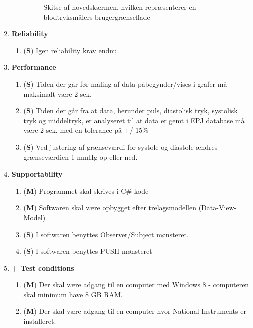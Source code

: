 \begin{enumerate}
\begin{enumerate}
\begin{figure}[h!]
\caption{Skitse af hovedskærmen, hvilken repræsenterer en blodtryksmålers brugergrænseflade}
\end{figure}
\end{enumerate}
\item \textbf{Reliability}
\begin{enumerate}
\item (\textbf{S}) Igen reliability krav endnu.
\end{enumerate}
\item \textbf{Performance}
\begin{enumerate}
\item (\textbf{S}) Tiden der går før måling af data påbegynder/vises i grafer må maksimalt være 2 sek.
\item (\textbf{S}) Tiden der går fra at data, herunder puls, diastolisk tryk, systolisk tryk og middeltryk, er analyseret til at data er gemt i EPJ database må være 2 sek. med en tolerance på +/-15\% 
\item (\textbf{S}) Ved justering af grænseværdi for systole og diastole ændres grænseværdien 1 mmHg op eller ned.                                                                                                                                                                                                                                                                                                                                                                                                                                                                                                                                                                                                                                                                                               
\end{enumerate}
\item \textbf{Supportability}
\begin{enumerate}
\item (\textbf{M}) Programmet skal skrives i C\# kode
\item (\textbf{M}) Softwaren skal være opbygget efter trelagsmodellen (Data-View-Model)
\item (\textbf{S}) I softwaren benyttes Observer/Subject mønsteret.
\item (\textbf{S}) I softwaren benyttes PUSH mønsteret
\end{enumerate}
\item \textbf{+ Test conditions}
\begin{enumerate}
\item (\textbf{M}) Der skal være adgang til en computer med Windows 8 - computeren skal minimum have 8 GB RAM.
\item (\textbf{M}) Der skal være adgang til en computer hvor National Instruments er installeret.
\end{enumerate}
\end{enumerate}

